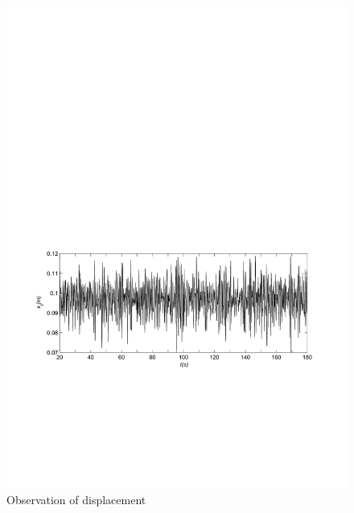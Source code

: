 \begin{figure}[!htb]
  \centering
  \includegraphics[width=\hsize]{MATLAB-observer.pdf}
  \caption{Observation of displacement}
  \label{fig:observe}
\end{figure}

